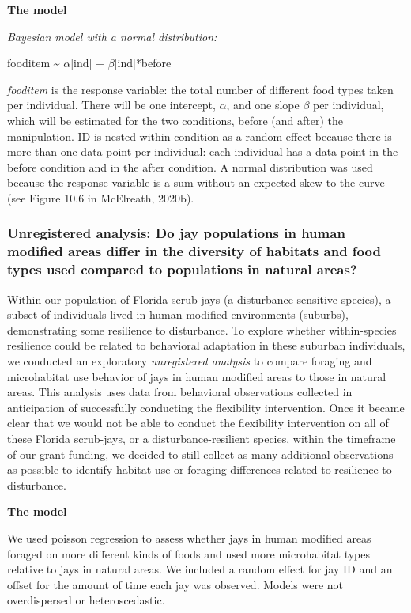 \documentclass[
]{article}
\begin{document}
\textbf{The model}

\emph{Bayesian model with a normal distribution:}

fooditem \textasciitilde{} \(\alpha\){[}ind{]} +
\(\beta\){[}ind{]}*before

\emph{fooditem} is the response variable: the total number of different
food types taken per individual. There will be one intercept,
\(\alpha\), and one slope \(\beta\) per individual, which will be
estimated for the two conditions, before (and after) the manipulation.
ID is nested within condition as a random effect because there is more
than one data point per individual: each individual has a data point in
the before condition and in the after condition. A normal distribution
was used because the response variable is a sum without an expected skew
to the curve (see Figure 10.6 in McElreath, 2020b).

\subsubsection{Unregistered analysis: Do jay populations in human
modified areas differ in the diversity of habitats and food types used
compared to populations in natural
areas?}\label{unregistered-analysis-do-jay-populations-in-human-modified-areas-differ-in-the-diversity-of-habitats-and-food-types-used-compared-to-populations-in-natural-areas}

Within our population of Florida scrub-jays (a disturbance-sensitive
species), a subset of individuals lived in human modified environments
(suburbs), demonstrating some resilience to disturbance. To explore
whether within-species resilience could be related to behavioral
adaptation in these suburban individuals, we conducted an exploratory
\emph{unregistered analysis} to compare foraging and microhabitat use
behavior of jays in human modified areas to those in natural areas. This
analysis uses data from behavioral observations collected in
anticipation of successfully conducting the flexibility intervention.
Once it became clear that we would not be able to conduct the
flexibility intervention on all of these Florida scrub-jays, or a
disturbance-resilient species, within the timeframe of our grant
funding, we decided to still collect as many additional observations as
possible to identify habitat use or foraging differences related to
resilience to disturbance.

\textbf{The model}

We used poisson regression to assess whether jays in human modified
areas foraged on more different kinds of foods and used more
microhabitat types relative to jays in natural areas. We included a
random effect for jay ID and an offset for the amount of time each jay
was observed. Models were not overdispersed or heteroscedastic.
\end{document}
